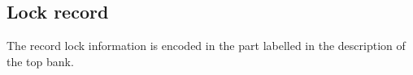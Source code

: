 \subsection*{Lock record}

The record lock information is encoded in the 
part labelled  in the description of the top bank.
%
